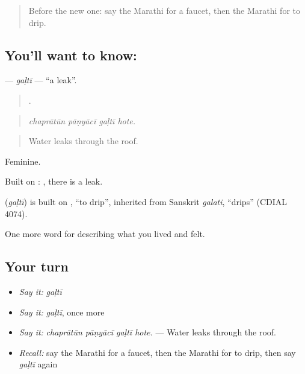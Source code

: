 \begin{quote}
Before the new one: say the Marathi for a faucet, then the Marathi for to drip.
\end{quote}

\subsection*{You'll want to know: }
\textbf{} — \emph{gaḷtī} — \textquotedblleft{}a leak\textquotedblright{}.

\begin{quote}
   .
\end{quote}

\begin{quote}
\emph{chaprātūn pāṇyācī gaḷtī hote.}
\end{quote}

\begin{quote}
Water leaks through the roof.
\end{quote}

Feminine.

Built on :  , there is a leak.

\begin{cousinweb}
\textbf{} (\emph{gaḷtī}) is built on , \textquotedblleft{}to drip\textquotedblright{}, inherited from Sanskrit \emph{galati}, \textquotedblleft{}drips\textquotedblright{} (CDIAL 4074).
\end{cousinweb}

\begin{grammarlens}[title={What you've built}]
One more word for describing what you lived and felt.
\end{grammarlens}

\subsection*{Your turn}
\begin{itemize}
\raggedright
  \item \emph{Say it:} \emph{gaḷtī}
  \item \emph{Say it:} \emph{gaḷtī}, once more
  \item \emph{Say it:} \emph{chaprātūn pāṇyācī gaḷtī hote.} — Water leaks through the roof.
  \item \emph{Recall:} say the Marathi for a faucet, then the Marathi for to drip, then say \emph{gaḷtī} again
\end{itemize}


